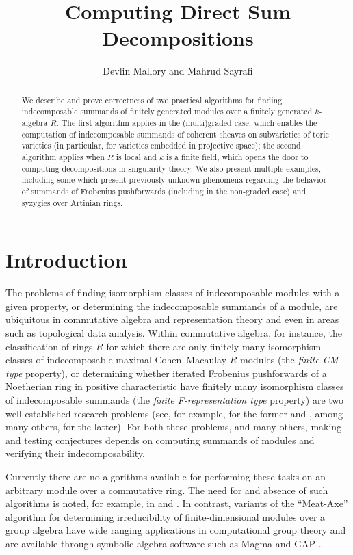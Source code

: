 \documentclass[12pt]{article}
\title{Computing Direct Sum Decompositions}
\author{Devlin Mallory and Mahrud Sayrafi}
\theoremstyle{theorem}
\numberwithin{thm}{section}
\theoremstyle{definition}
\begin{document}
\maketitle

\begin{abstract}
  We describe and prove correctness of two practical algorithms for finding indecomposable summands of finitely generated modules over a finitely generated $k$-algebra $R$. The first algorithm applies in the (multi)graded case, which enables the computation of indecomposable summands of coherent sheaves on subvarieties of toric varieties (in particular, for varieties embedded in projective space); the second algorithm applies when $R$ is local and $k$ is a finite field, which opens the door to computing decompositions in singularity theory. We also present multiple examples, including some which present previously unknown phenomena regarding the behavior of summands of Frobenius pushforwards (including in the non-graded case) and syzygies over Artinian rings.
\end{abstract}

\section{Introduction}

The problems of finding isomorphism classes of indecomposable modules with a given property, or determining the indecomposable summands of a module, are ubiquitous in commutative algebra and representation theory and even in areas such as topological data analysis. Within commutative algebra, for instance, the classification of rings $R$ for which there are only finitely many isomorphism classes of indecomposable maximal Cohen--Macaulay $R$-modules (the \emph{finite CM-type} property), or determining whether iterated Frobenius pushforwards of a Noetherian ring in positive characteristic have finitely many isomorphism classes of indecomposable summands (the \emph{finite F-representation type} property) are two well-established research problems (see, for example, \cite{Yoshino90,LW12} for the former and \cite{SVdB97,Hara15,TT08}, among many others, for the latter). For both these problems, and many others, making and testing conjectures depends on computing summands of modules and verifying their indecomposability.

Currently there are no algorithms available for performing these tasks on an arbitrary module over a commutative ring. The need for and absence of such algorithms is noted, for example, in \cite[\S15.10.9]{Eisenbud95} and \cite[\S8.5]{BL23}. In contrast, variants of the ``Meat-Axe'' algorithm for determining irreducibility of finite-dimensional modules over a group algebra have wide ranging applications in computational group theory \cite{Parker84,HR94,Holt98,IL00} and are available through symbolic algebra software such as Magma and GAP \cite{MAGMA,GAP}.
\end{document}
